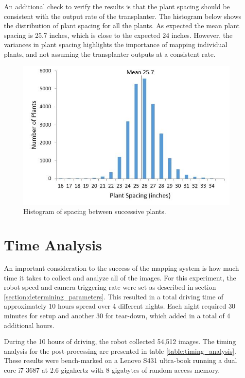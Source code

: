 An additional check to verify the results is that the plant spacing should be consistent with the output rate of the transplanter.  The histogram below shows the distribution of plant spacing for all the plants.  As expected the mean plant spacing is 25.7 inches, which is close to the expected 24 inches. However, the variances in plant spacing highlights the importance of mapping individual plants, and not assuming the transplanter outputs at a consistent rate.

\begin{figure}
	\centering
    \includegraphics[width=5in]{figures/plant_spacing.jpg}
    \caption[Plant spacing histogram]{Histogram of spacing between successive plants.}
    \label{figure:plant_spacing}
\end{figure}

\section{Time Analysis}

An important consideration to the success of the mapping system is how much time it takes to collect and analyze all of the images. For this experiment, the robot speed and camera triggering rate were set as described in section \ref{section:determining_parameters}.  This resulted in a total driving time of approximately 10 hours spread over 4 different nights.  Each night required 30 minutes for setup and another 30 for tear-down, which added in a total of 4 additional hours.  

During the 10 hours of driving, the robot collected 54,512 images.  The timing analysis for the post-processing are presented in table \ref{table:timing_analysis}. These results were bench-marked on a Lenovo S431 ultra-book running a dual core i7-3687 at 2.6 gigahertz with 8 gigabytes of random access memory.  

